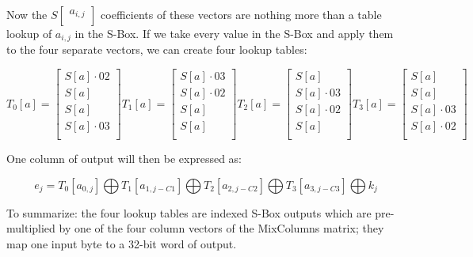 \documentclass{article}
\begin{document}
Now the $S \begin{bmatrix} a_{i,j} \\ \end{bmatrix}$ coefficients of these vectors are nothing more than a table lookup of $a_{i,j}$ in the S-Box. If we take every value in the S-Box and apply them to the four separate vectors, we can create four lookup tables:

\[
T_{0}[a] =
\begin{bmatrix}
S[a] \cdot 02 \\
S[a] \\
S[a] \\
S[a] \cdot 03 \\
\end{bmatrix}
T_{1}[a] =
\begin{bmatrix}
S[a] \cdot 03 \\
S[a] \cdot 02\\
S[a] \\
S[a] \\
\end{bmatrix}
T_{2}[a] =
\begin{bmatrix}
S[a] \\
S[a] \cdot 03 \\
S[a] \cdot 02\\
S[a] \\
\end{bmatrix}
T_{3}[a] =
\begin{bmatrix}
S[a] \\
S[a] \\
S[a] \cdot 03\\
S[a] \cdot 02\\
\end{bmatrix}
\]

One column of output will then be expressed as:

\[
e_{j} = T_{0}[a_{0,j}]
\bigoplus
T_{1}[a_{1,j-C1}]
\bigoplus
T_{2}[a_{2,j-C2}]
\bigoplus
T_{3}[a_{3,j-C3}]
\bigoplus
k_{j}
\]

To summarize: the four lookup tables are indexed S-Box outputs which are pre-multiplied by one of the four column vectors of the MixColumns matrix; they map one input byte to a 32-bit word of output.

\end{document}

